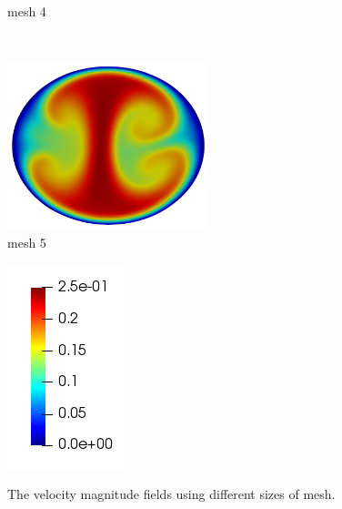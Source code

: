 \begin{figure}[htbp]
\begin{minipage}[c][2in][c]{0.4\linewidth}
        mesh 4
    \end{minipage}\\[.5\baselineskip]
    \begin{minipage}[c][2in][c]{0.4\linewidth}
        \centering
        \includegraphics[width=2.3in]{imgs/vena_cava/Umag_mesh5.png}\\
        mesh 5
    \end{minipage}
    \begin{minipage}[c][2in][c]{0.4\linewidth}
        \centering
        \includegraphics[width=.7in]{imgs/vena_cava/colormap_exercise.png}\\
    \end{minipage}
    \caption{The velocity magnitude fields using different sizes of mesh.}
    \label{fig:velmag}
\end{figure}

